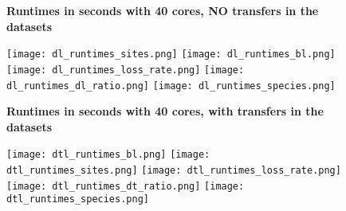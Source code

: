 \documentclass[12pt,a4paper]{article}
\begin{document}
\newcommand*{\figuretitle}[1]{%
    {\centering%
    \textbf{#1}%
    \par\medskip}%
}





\begin{figure}
\figuretitle{Runtimes in seconds with 40 cores, NO transfers in the datasets}
\texttt{[image: dl\_runtimes\_sites.png]}
\texttt{[image: dl\_runtimes\_bl.png]}
\texttt{[image: dl\_runtimes\_loss\_rate.png]}
\texttt{[image: dl\_runtimes\_dl\_ratio.png]}
\texttt{[image: dl\_runtimes\_species.png]}
\end{figure}


\begin{figure}
\figuretitle{Runtimes in seconds with 40 cores, with transfers in the datasets}
\texttt{[image: dtl\_runtimes\_bl.png]}
\texttt{[image: dtl\_runtimes\_sites.png]}
\texttt{[image: dtl\_runtimes\_loss\_rate.png]}
\texttt{[image: dtl\_runtimes\_dt\_ratio.png]}
\texttt{[image: dtl\_runtimes\_species.png]}
\end{figure}
\end{document}
